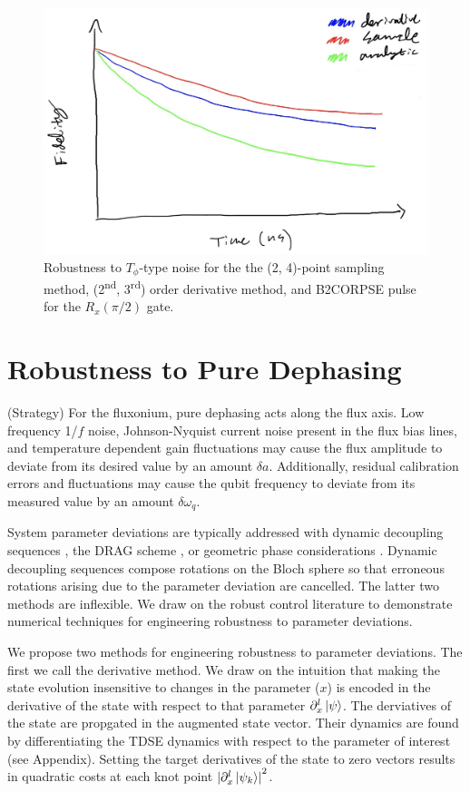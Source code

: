 \documentclass[
  amsfonts,
  amsmath,
  tbtags,
  amssymb,
  aps,
  nobibnotes,
  twocolumn,
]{revtex4-2}
\begin{document}
\begin{figure}
  \includegraphics[width=\linewidth]{assets/t2_temp.jpg}
  \caption{Robustness to $T_{\phi}$-type noise for the
    the (2, 4)-point sampling method, (2\textsuperscript{nd}, 3\textsuperscript{rd})
    order derivative method, and B2CORPSE pulse for the $R_{x}(\pi/2)$ gate.}
\end{figure}


\section{Robustness to Pure Dephasing}
(Strategy) For the fluxonium, pure dephasing acts
along the flux axis. Low frequency 1/$f$ noise,
Johnson-Nyquist current noise present in the flux bias
lines, and temperature dependent gain fluctuations
may cause the flux amplitude to deviate from its
desired value by an amount $\delta a$. Additionally,
residual calibration errors and fluctuations may cause
the qubit frequency to deviate from its measured value
by an amount $\delta \omega_{q}$.

System parameter
deviations are typically addressed with dynamic decoupling
sequences \cite{merrill2014progress},
the DRAG scheme \cite{krantz2019quantum}, or
geometric phase considerations
\cite{xu2020nonadiabatic} \cite{han2020experimental}.
Dynamic decoupling sequences compose rotations on the
Bloch sphere so that erroneous rotations arising due
to the parameter deviation are cancelled.
The latter two methods are inflexible. We draw on the
robust control literature to demonstrate
numerical techniques for engineering robustness
to parameter deviations.

We propose two methods for engineering robustness
to parameter deviations. The first we call the
derivative method. We draw on the intuition that
making the state evolution insensitive to changes
in the parameter ($x$) is encoded in the derivative of
the state with respect to that parameter
$\partial_{x}^{l} \ket{\psi}$.
The derviatives of the state are propgated in the
augmented state vector. Their dynamics are found by differentiating
the TDSE dynamics with respect to the parameter of interest
(see Appendix). Setting the target derivatives of the state
to zero vectors results in quadratic costs at each
knot point
${\lvert \partial_{x}^{l} \ket{\psi_{k}} \rvert}^{2}$.
\end{document}
